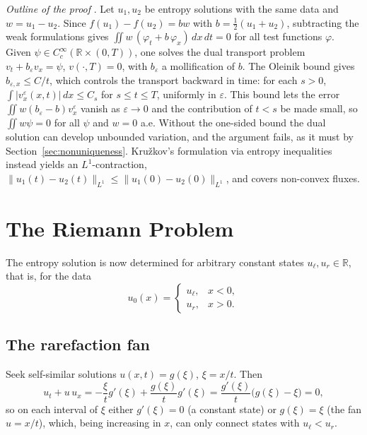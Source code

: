 \emph{Outline of the proof} \cite[\S3.4.3]{evans2010}. Let $u_1,u_2$ be entropy
solutions with the same data and $w=u_1-u_2$. Since $f(u_1)-f(u_2)=bw$ with
$b=\tfrac12(u_1+u_2)$, subtracting the weak formulations gives
$\iint w\,(\varphi_t+b\,\varphi_x)\,dx\,dt=0$ for all test functions $\varphi$.
Given $\psi\in C_c^\infty(\mathbb{R}\times(0,T))$, one solves the dual transport
problem $v_t+b_\varepsilon v_x=\psi$, $v(\cdot,T)=0$, with $b_\varepsilon$ a
mollification of $b$. The Oleinik bound gives $b_{\varepsilon,x}\le C/t$, which
controls the transport backward in time: for each $s>0$,
$\int|v^\varepsilon_x(x,t)|\,dx\le C_s$ for $s\le t\le T$, uniformly in
$\varepsilon$. This bound lets the error $\iint w(b_\varepsilon-b)v^\varepsilon_x$
vanish as $\varepsilon\to0$ and the contribution of $t<s$ be made small, so
$\iint w\psi=0$ for all $\psi$ and $w=0$ a.e. Without the one-sided bound the
dual solution can develop unbounded variation, and the argument fails, as it
must by Section~\ref{sec:nonuniqueness}. Kru\v{z}kov's formulation via entropy
inequalities \cite{kruzhkov1970} instead yields an $L^1$-contraction,
$\|u_1(t)-u_2(t)\|_{L^1}\le\|u_{1}(0)-u_{2}(0)\|_{L^1}$, and covers non-convex
fluxes.


\section{The Riemann Problem}
\label{sec:riemann-problem}

The entropy solution is now determined for arbitrary constant states
$u_\ell, u_r \in \mathbb{R}$, that is, for the data
\begin{equation}
  \label{eq:general-riemann-data}
  u_0(x) = \begin{cases} u_\ell, & x<0, \\ u_r, & x>0. \end{cases}
\end{equation}

\subsection{The rarefaction fan}
\label{subsec:rarefaction-general}

Seek self-similar solutions $u(x,t)=g(\xi)$, $\xi=x/t$. Then
\begin{equation}
  u_t + u\,u_x = -\frac{\xi}{t}g'(\xi) + \frac{g(\xi)}{t}g'(\xi)
  = \frac{g'(\xi)}{t}\big(g(\xi)-\xi\big) = 0,
\end{equation}
so on each interval of $\xi$ either $g'(\xi)=0$ (a constant state) or
$g(\xi)=\xi$ (the fan $u=x/t$), which, being increasing in $x$, can only connect
states with $u_\ell<u_r$.

